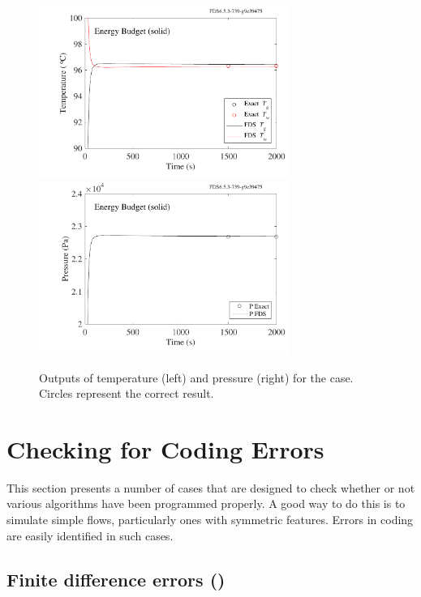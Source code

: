 \documentclass[11pt]{book}
\begin{document}
\begin{figure}[ht]
\includegraphics[width=3.2in]{SCRIPT_FIGURES/energy_budget_solid_T}
\includegraphics[width=3.2in]{SCRIPT_FIGURES/energy_budget_solid_P}
\caption[The  test case]{\label{fig_solid_energy} Outputs of temperature (left) and pressure (right) for the  case.  Circles represent the correct result.}
\end{figure}

\clearpage


\section{Checking for Coding Errors}

This section presents a number of cases that are designed to check whether or not various algorithms have been programmed properly. A good way to do this is to simulate simple flows, particularly ones with symmetric features. Errors in coding are easily identified in such cases.

\subsection{Finite difference errors (\texorpdfstring{}{symmetry\_test})}
\end{document}
